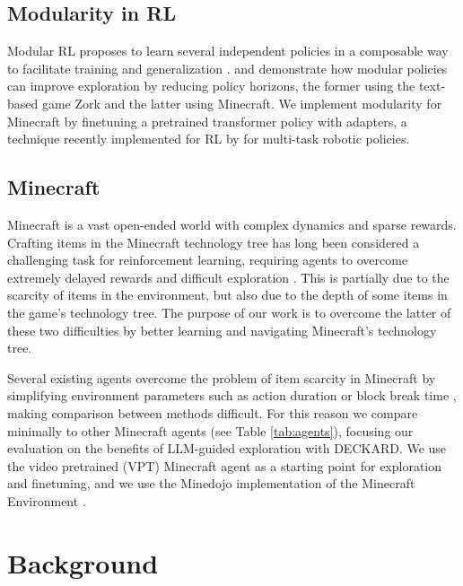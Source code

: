 \documentclass[nohyperref]{article}
\theoremstyle{plain}
\theoremstyle{definition}
\theoremstyle{remark}
\newcommand{\agentshort}{\textsc{DECKARD}}
\begin{document}
\subsection{Modularity in RL}

Modular RL proposes to learn several independent policies in a composable way to facilitate training and generalization \cite{Simpkins_Isbell_2019}.
\citet{ammanabrolu2020avoid} and \citet{Patil2020AlignRUDDERLF} demonstrate how modular policies can improve exploration by reducing policy horizons, the former using the text-based game Zork and the latter using Minecraft.
We implement modularity for Minecraft by finetuning a pretrained transformer policy with adapters, a technique recently implemented for RL by \citet{liang2022transformer} for multi-task robotic policies.

\subsection{Minecraft}
\label{sec:mine}

Minecraft is a vast open-ended world with complex dynamics and sparse rewards.
Crafting items in the Minecraft technology tree has long been considered a challenging task for reinforcement learning, requiring agents to overcome extremely delayed rewards and difficult exploration \cite{SkrynnikForgetful,Patil2020AlignRUDDERLF,danijardreamer}.
This is partially due to the scarcity of items in the environment, but also due to the depth of some items in the game's technology tree.
The purpose of our work is to overcome the latter of these two difficulties by better learning and navigating Minecraft's technology tree.

Several existing agents overcome the problem of item scarcity in Minecraft by simplifying environment parameters such as action duration \cite{Patil2020AlignRUDDERLF} or block break time \cite{danijardreamer}, making comparison between methods difficult.
For this reason we compare minimally to other Minecraft agents (see Table \ref{tab:agents}), focusing our evaluation on the benefits of LLM-guided exploration with \agentshort{}.
We use the video pretrained (VPT) Minecraft agent \cite{bakervideo} as a starting point for exploration and finetuning, and we use the Minedojo implementation of the Minecraft Environment \cite{fanminedojo}.

\section{Background}
\end{document}
